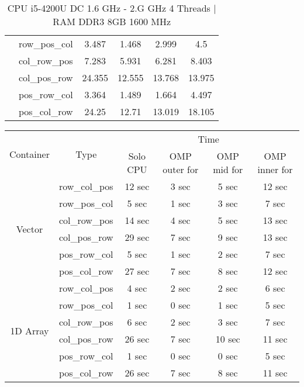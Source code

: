 \documentclass[11pt]{article}
\begin{document}
\begin{table}[H]
\begin{tabular}{ |c|c|c|c|c|c|  }
                            & row\_pos\_col & 3.487 & 1.468 & 2.999 & 4.5  \\ 
                            & col\_row\_pos & 7.283 & 5.931 & 6.281 & 8.403  \\   
                            & col\_pos\_row & 24.355 & 12.555 & 13.768 & 13.975  \\ 
                            & pos\_row\_col & 3.364 & 1.489 & 1.664 & 4.497  \\ 
                            & pos\_col\_row & 24.25 & 12.71 & 13.019 & 18.105  \\ 
\hline
\end{tabular}
\caption{CPU i5-4200U DC 1.6 GHz - 2.G GHz 4 Threads $|$ RAM DDR3 8GB 1600 MHz }
\end{table}
\begin{table}[H]
\centering
\begin{tabular}{ |c|c|c|c|c|c|  }
\hline
\multirow{2}{*}{Container}  & \multirow{2}{*}{Type} & \multicolumn{4}{c|}{ Time} \\ \cline{3-6}
                            &                       &  Solo CPU& OMP outer for & OMP mid for & OMP inner for \\
\hline
\multirow{6}{*}{Vector}     & row\_col\_pos & 12 sec & 3 sec & 5 sec & 12 sec \\
                            & row\_pos\_col & 5 sec &  1 sec & 3 sec & 7 sec \\
                            & col\_row\_pos & 14 sec & 4 sec & 5 sec & 13 sec \\  
                            & col\_pos\_row & 29 sec & 7 sec & 9 sec & 13 sec \\
                            & pos\_row\_col & 5 sec & 1 sec & 2 sec & 7 sec \\
                            & pos\_col\_row & 27 sec & 7 sec & 8 sec & 12 sec \\
\hline
\multirow{6}{*}{1D Array}   & row\_col\_pos & 4 sec & 2 sec & 2 sec & 6 sec \\
                            & row\_pos\_col & 1 sec & 0 sec & 1 sec & 5 sec \\
                            & col\_row\_pos & 6 sec & 2 sec & 3 sec & 7 sec \\  
                            & col\_pos\_row & 26 sec & 7 sec & 10 sec & 11 sec \\
                            & pos\_row\_col & 1 sec & 0 sec & 0 sec & 5 sec \\
                            & pos\_col\_row & 26 sec & 7 sec & 8 sec & 11 sec \\

\end{tabular}
\end{table}
\end{document}
